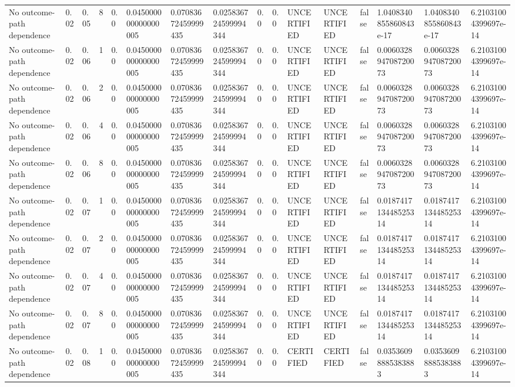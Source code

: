 \begin{tabular}{llllllllllllllll}
No outcome-path dependence & 0.02 & 0.05 & 8 & 0.0 & 0.045000000000000005 & 0.07083672459999435 & 0.025836724599994344 & 0.0 & 0.0 & UNCERTIFIED & UNCERTIFIED & false & 1.0408340855860843e-17 & 1.0408340855860843e-17 & 6.21031004399697e-14 \\
No outcome-path dependence & 0.02 & 0.06 & 1 & 0.0 & 0.045000000000000005 & 0.07083672459999435 & 0.025836724599994344 & 0.0 & 0.0 & UNCERTIFIED & UNCERTIFIED & false & 0.006032894708720073 & 0.006032894708720073 & 6.21031004399697e-14 \\
No outcome-path dependence & 0.02 & 0.06 & 2 & 0.0 & 0.045000000000000005 & 0.07083672459999435 & 0.025836724599994344 & 0.0 & 0.0 & UNCERTIFIED & UNCERTIFIED & false & 0.006032894708720073 & 0.006032894708720073 & 6.21031004399697e-14 \\
No outcome-path dependence & 0.02 & 0.06 & 4 & 0.0 & 0.045000000000000005 & 0.07083672459999435 & 0.025836724599994344 & 0.0 & 0.0 & UNCERTIFIED & UNCERTIFIED & false & 0.006032894708720073 & 0.006032894708720073 & 6.21031004399697e-14 \\
No outcome-path dependence & 0.02 & 0.06 & 8 & 0.0 & 0.045000000000000005 & 0.07083672459999435 & 0.025836724599994344 & 0.0 & 0.0 & UNCERTIFIED & UNCERTIFIED & false & 0.006032894708720073 & 0.006032894708720073 & 6.21031004399697e-14 \\
No outcome-path dependence & 0.02 & 0.07 & 1 & 0.0 & 0.045000000000000005 & 0.07083672459999435 & 0.025836724599994344 & 0.0 & 0.0 & UNCERTIFIED & UNCERTIFIED & false & 0.018741713448525314 & 0.018741713448525314 & 6.21031004399697e-14 \\
No outcome-path dependence & 0.02 & 0.07 & 2 & 0.0 & 0.045000000000000005 & 0.07083672459999435 & 0.025836724599994344 & 0.0 & 0.0 & UNCERTIFIED & UNCERTIFIED & false & 0.018741713448525314 & 0.018741713448525314 & 6.21031004399697e-14 \\
No outcome-path dependence & 0.02 & 0.07 & 4 & 0.0 & 0.045000000000000005 & 0.07083672459999435 & 0.025836724599994344 & 0.0 & 0.0 & UNCERTIFIED & UNCERTIFIED & false & 0.018741713448525314 & 0.018741713448525314 & 6.21031004399697e-14 \\
No outcome-path dependence & 0.02 & 0.07 & 8 & 0.0 & 0.045000000000000005 & 0.07083672459999435 & 0.025836724599994344 & 0.0 & 0.0 & UNCERTIFIED & UNCERTIFIED & false & 0.018741713448525314 & 0.018741713448525314 & 6.21031004399697e-14 \\
No outcome-path dependence & 0.02 & 0.08 & 1 & 0.0 & 0.045000000000000005 & 0.07083672459999435 & 0.025836724599994344 & 0.0 & 0.0 & CERTIFIED & CERTIFIED & false & 0.03536098885383883 & 0.03536098885383883 & 6.21031004399697e-14 \\

\end{tabular}
